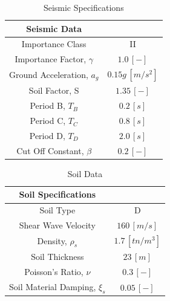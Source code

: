 \documentclass[11pt,a4paper,titlepage]{report}
\begin{document}
\begin{table}[h!]
  \begin{center}
    \begin{tabular}{c|c}
    \hline
      \textbf{Seismic Data}\\
      \hline
      Importance Class & II\\
      Importance Factor, $\gamma$ & $1.0\,[-]$\\
      Ground Acceleration, $a_g$ & $0.15g\,[m/s^2]$\\
      Soil Factor, S & $1.35\,[-]$\\
      Period B, $T_B$ & $0.2\,[s]$\\
      Period C, $T_C$ & $0.8\, [s]$\\
      Period D, $T_D$ & $2.0\, [s]$\\
      Cut Off Constant, $\beta$ & $0.2\,[-]$\\
      \end{tabular}
  \end{center}
   \caption{Seismic Specifications}
    \label{tab: specifications - seismic}
\end{table}
\begin{table}[h!]
  \begin{center}
    \begin{tabular}{c|c}
    \hline
      \textbf{Soil Specifications}\\
      \hline
      Soil Type & D\\
      Shear Wave Velocity & $160\,[m/s]$\\
      Density, $\rho_s$ & $1.7\,[tn/m^3]$\\
      Soil Thickness & $23\,[m]$\\
      Poisson's Ratio, $\nu$ & $0.3\,[-]$\\
      Soil Material Damping, $\xi_s$ & $0.05\,[-]$\\
      \end{tabular}
  \end{center}
  \caption{Soil Data}
    \label{tab: specifications - soil}
\end{table}
\end{document}
